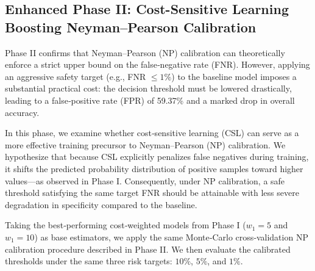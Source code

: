 \documentclass[journal,twoside,web]{ieeecolor}
\begin{document}
\subsection{Enhanced Phase II: Cost-Sensitive Learning Boosting Neyman–Pearson Calibration}\label{S3-4}

Phase II confirms that Neyman–Pearson (NP) calibration can theoretically enforce a strict upper bound on the false‑negative rate (FNR). However, applying an aggressive safety target (e.g., FNR $\leq 1\%$) to the baseline model imposes a substantial practical cost: the decision threshold must be lowered drastically, leading to a false‑positive rate (FPR) of 59.37\% and a marked drop in overall accuracy.

In this phase, we examine whether cost‑sensitive learning (CSL) can serve as a more effective training precursor to Neyman–Pearson (NP) calibration. We hypothesize that because CSL explicitly penalizes false negatives during training, it shifts the predicted probability distribution of positive samples toward higher values—as observed in Phase I. Consequently, under NP calibration, a safe threshold satisfying the same target FNR should be attainable with less severe degradation in specificity compared to the baseline.

Taking the best‑performing cost‑weighted models from Phase I (\(w_{1}=5\) and \(w_{1}=10\)) as base estimators, we apply the same Monte‑Carlo cross‑validation NP calibration procedure described in Phase II. We then evaluate the calibrated thresholds under the same three risk targets: \(10\%\), \(5\%\), and \(1\%\).


\begin{table}[htbp]
    \centering
    \caption{The prediction performance with cost-sensitive learning boosting NP threshold calibration.}
    \label{tab:csl_np_results}
\end{table}
\end{document}

